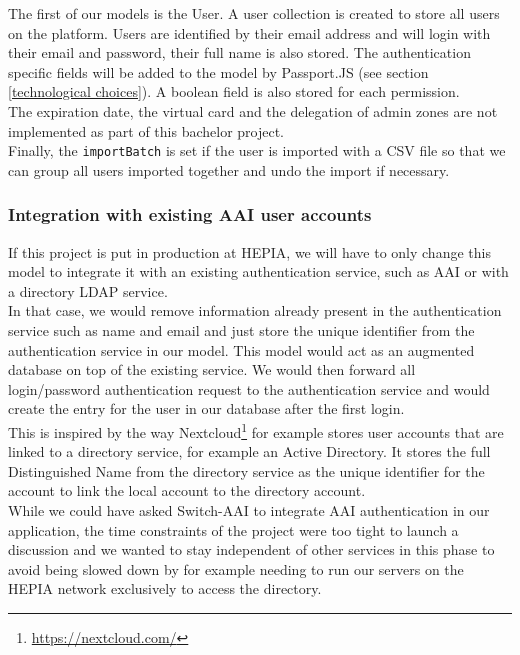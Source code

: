 \documentclass[11pt,a4paper]{report}
\begin{document}
The first of our models is the User. A user collection is created to store all users on the platform. Users are identified by their email address and will login with their email and password, their full name is also stored. The authentication specific fields will be added to the model by Passport.JS (see section \ref{technological choices}). A boolean field is also stored for each permission.\\

The expiration date, the virtual card and the delegation of admin zones are not implemented as part of this bachelor project. \\

Finally, the \verb+importBatch+ is set if the user is imported with a CSV file so that we can group all users imported together and undo the import if necessary.
\subsubsection{Integration with existing AAI user accounts}
If this project is put in production at HEPIA, we will have to only change this model to integrate it with an existing authentication service, such as AAI or with a directory LDAP service.\\

In that case, we would remove information already present in the authentication service such as name and email and just store the unique identifier from the authentication service in our model. This model would act as an augmented database on top of the existing service. We would then forward all login/password authentication request to the authentication service and would create the entry for the user in our database after the first login.\\

This is inspired by the way Nextcloud\footnote{\url{https://nextcloud.com/}} for example stores user accounts that are linked to a directory service, for example an Active Directory. It stores the full Distinguished Name from the directory service as the unique identifier for the account to link the local account to the directory account.\\

While we could have asked Switch-AAI to integrate AAI authentication in our application, the time constraints of the project were too tight to launch a discussion and we wanted to stay independent of other services in this phase to avoid being slowed down by for example needing to run our servers on the HEPIA network exclusively to access the directory.
\end{document}
